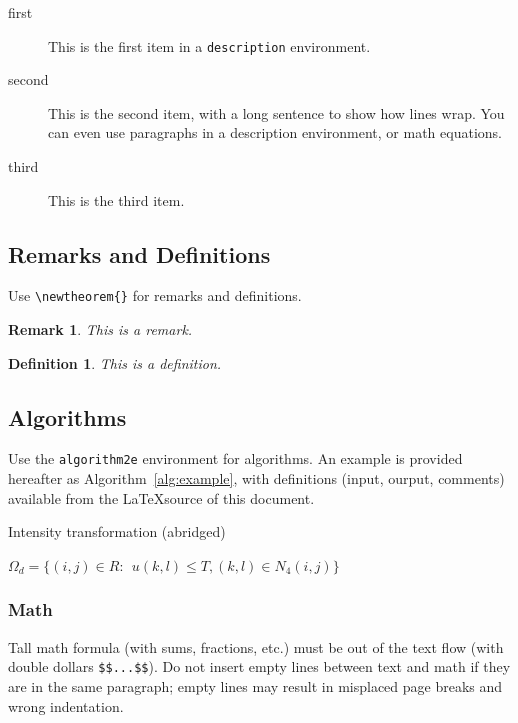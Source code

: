 \documentclass{ipol}
\newtheorem{definition}{Definition}
\newtheorem*{remark}{Remark}
\begin{document}
\begin{description}
\item[first] This is the first item in a \verb|description|
  environment.
\item[second] This is the second item, with a long sentence to show
  how lines wrap. You can even use paragraphs in a description
  environment, or math equations.
\item[third] This is the third item.
\end{description}

\subsection{Remarks and Definitions}

Use \verb|\newtheorem{}| for remarks and definitions.

\begin{remark}
  This is a remark.
\end{remark}

\begin{definition}
  This is a definition.
\end{definition}

\subsection{Algorithms}

Use the \verb|algorithm2e| environment for
algorithms. An example is provided hereafter as
Algorithm~\ref{alg:example}, with definitions (input, ourput,
comments) available from the \LaTeX source of this document.

\begin{algorithm}[!htbp]
\caption{Intensity transformation (abridged)}
\DontPrintSemicolon
{}
$\Omega_d=\{(i, j)\in R: \ \ u(k,l) \leq T, (k,l) \in N_4(i,j)\}$
\label{alg:example}
\end{algorithm}

\subsubsection{Math}

Tall math formula (with sums, fractions, etc.) must be out of the text
flow (with double dollars
\verb|$$...$$|). Do not insert empty lines between text and math
if they are in the same paragraph; empty lines may result in misplaced page
breaks and wrong indentation.
\end{document}
